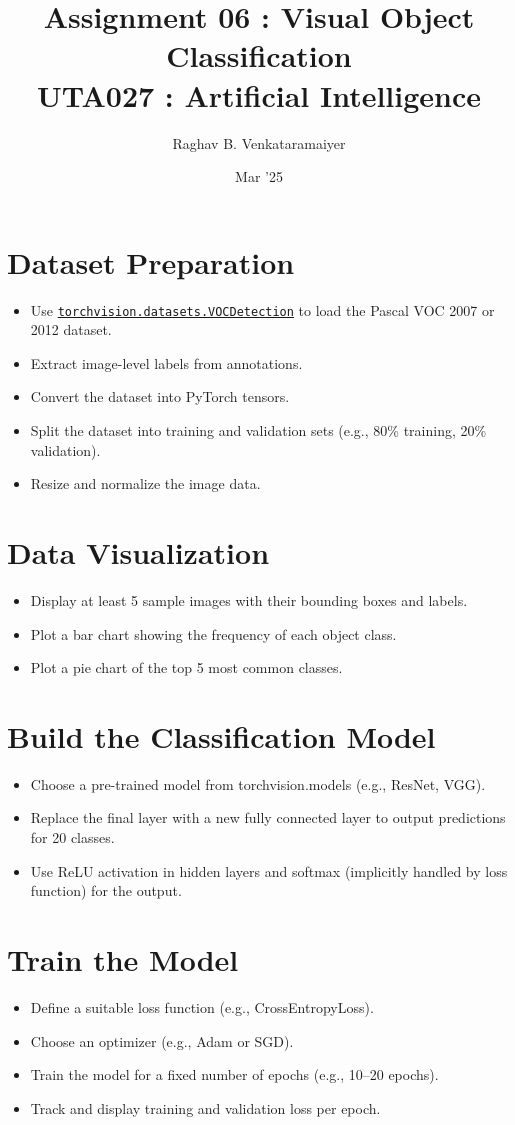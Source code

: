 \documentclass[11pt]{article}
\author{Raghav B. Venkataramaiyer}
\date{Mar '25}
\title{Assignment 06 : Visual Object Classification\\\medskip
\large UTA027 : Artificial Intelligence}
\begin{document}
\maketitle

\section{Dataset Preparation}
\label{sec:orgf365517}
\begin{itemize}
\item Use \href{https://pytorch.org/vision/stable/generated/torchvision.datasets.VOCDetection.html}{\texttt{torchvision.datasets.VOCDetection}} to load the
Pascal VOC 2007 or 2012 dataset.
\item Extract image-level labels from annotations.
\item Convert the dataset into PyTorch tensors.
\item Split the dataset into training and validation sets
(e.g., 80\% training, 20\% validation).
\item Resize and normalize the image data.
\end{itemize}
\section{Data Visualization}
\label{sec:org1a39cb4}
\begin{itemize}
\item Display at least 5 sample images with their bounding
boxes and labels.
\item Plot a bar chart showing the frequency of each object
class.
\item Plot a pie chart of the top 5 most common classes.
\end{itemize}
\section{Build the Classification Model}
\label{sec:org8032370}
\begin{itemize}
\item Choose a pre-trained model from torchvision.models
(e.g., ResNet, VGG).
\item Replace the final layer with a new fully connected
layer to output predictions for 20 classes.
\item Use ReLU activation in hidden layers and softmax
(implicitly handled by loss function) for the output.
\end{itemize}
\section{Train the Model}
\label{sec:orge908922}
\begin{itemize}
\item Define a suitable loss function (e.g.,
CrossEntropyLoss).
\item Choose an optimizer (e.g., Adam or SGD).
\item Train the model for a fixed number of epochs (e.g.,
10–20 epochs).
\item Track and display training and validation loss per
epoch.
\end{itemize}
\end{document}
